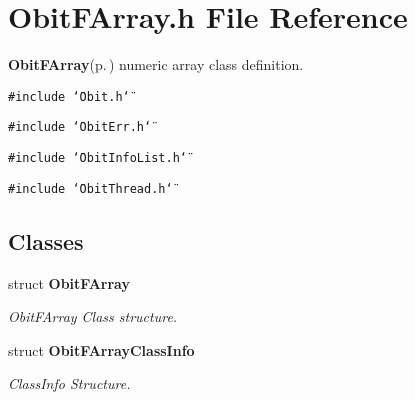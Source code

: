 \section{Obit\-FArray.h File Reference}
\label{ObitFArray_8h}
{\bf Obit\-FArray}{\rm (p.\,\pageref{structObitFArray})} numeric array class definition. 

{\tt \#include \char`\"{}Obit.h\char`\"{}}\par
{\tt \#include \char`\"{}Obit\-Err.h\char`\"{}}\par
{\tt \#include \char`\"{}Obit\-Info\-List.h\char`\"{}}\par
{\tt \#include \char`\"{}Obit\-Thread.h\char`\"{}}\par
\subsection*{Classes}
\begin{CompactItemize}
\item 
struct {\bf Obit\-FArray}
\begin{CompactList}\small\item\em Obit\-FArray Class structure. \item\end{CompactList}\item 
struct {\bf Obit\-FArray\-Class\-Info}
\begin{CompactList}\small\item\em Class\-Info Structure. \item\end{CompactList}\end{CompactItemize}
